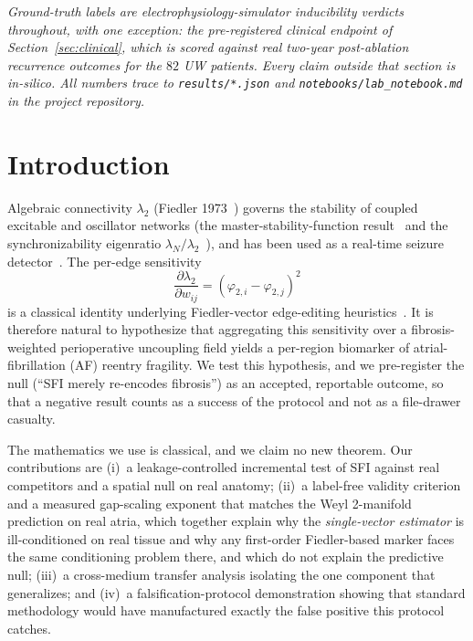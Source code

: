 \documentclass[11pt]{article}
\theoremstyle{definition}
\newcommand{\lam}{\lambda}
\newcommand{\phii}{\varphi}
\newcommand{\code}[1]{\texttt{#1}}
\begin{document}
\medskip
\noindent\emph{Ground-truth labels are electrophysiology-simulator inducibility
verdicts throughout, with one exception: the pre-registered clinical endpoint of
Section~\ref{sec:clinical}, which is scored against real two-year
post-ablation recurrence outcomes for the $82$ UW patients. Every claim outside
that section is in-silico. All numbers trace to \code{results/*.json} and
\code{notebooks/lab\_notebook.md} in the project repository.}


\section{Introduction}
Algebraic connectivity $\lam_2$ (Fiedler 1973~\cite{fiedler1973}) governs the
stability of coupled excitable and oscillator networks (the
master-stability-function result~\cite{pecora1998} and the synchronizability
eigenratio $\lam_N/\lam_2$~\cite{barahona2002}), and has been used as a
real-time seizure detector~\cite{bomela2020}. The per-edge sensitivity
\begin{equation}
\frac{\partial\lam_2}{\partial w_{ij}}=(\phii_{2,i}-\phii_{2,j})^2
\label{eq:edge}
\end{equation}
is a classical identity underlying Fiedler-vector edge-editing
heuristics~\cite{ghosh2006}. It is therefore natural to hypothesize that
aggregating this sensitivity over a fibrosis-weighted perioperative uncoupling
field yields a per-region biomarker of atrial-fibrillation (AF) reentry
fragility. We test this hypothesis, and we pre-register the null
(``SFI merely re-encodes fibrosis'') as an accepted, reportable outcome, so
that a negative result counts as a success of the protocol and not as a
file-drawer casualty.

The mathematics we use is classical, and we claim no new theorem. Our
contributions are
(i)~a leakage-controlled incremental test of SFI against real competitors and a
spatial null on real anatomy; (ii)~a label-free validity criterion and a
measured gap-scaling exponent that
matches the Weyl 2-manifold prediction on real atria, which together explain why
the \emph{single-vector estimator} is ill-conditioned on real tissue and why any
first-order Fiedler-based marker faces the same conditioning problem there, and
which do not explain the predictive null; (iii)~a cross-medium transfer analysis
isolating the one
component that generalizes; and (iv)~a falsification-protocol demonstration
showing that standard methodology would have manufactured exactly the false
positive this protocol catches.
\end{document}
